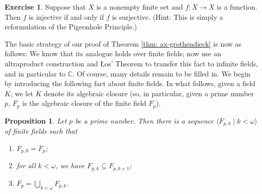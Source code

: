\documentclass[a4paper]{memoir}
\newtheorem{proposition}[theorem]{Proposition}
\theoremstyle{definition}
\newtheorem{exercise}[theorem]{Exercise}
\newcommand{\bb}{\mathbb}
\newcommand{\ra}{\rightarrow}
\begin{document}
\begin{exercise} \label{exercise: finite_ax_grothendieck}
  Suppose that $X$ is a nonempty finite set and $f:X \ra X$ is a function. Then $f$ is injective if and 
  only if $f$ is surjective. (Hint: This is simply a reformulation of the Pigeonhole Principle.)
\end{exercise}

The basic strategy of our proof of Theorem \ref{thm: ax-grothendieck} is now as follows: 
We know that its analogue holds over finite fields; now use an ultraproduct construction 
and \L os' Theorem to transfer this fact to infinite fields, and in particular to $\bb{C}$. 
Of course, many details remain to be filled in. We begin by introducing the following fact 
about finite fields. In what follows, given a field $K$, we let $\overline{K}$ denote its 
algebraic closure (so, in particular, given a prime number $p$, $\overline{F_p}$ is the algebraic 
closure of the finite field $F_p$).

\begin{proposition} \label{prop: finite_field_completion}
  Let $p$ be a prime number. Then there is a sequence $\langle F_{p,k} \mid k < \omega \rangle$ 
  of finite fields such that
  \begin{enumerate}
    \item $F_{p,0} = F_p$;
    \item for all $k < \omega$, we have $F_{p,k} \subseteq F_{p,k+1}$;
    \item $\overline{F_p} = \bigcup_{k < \omega} F_{p,k}$.
  \end{enumerate}
\end{proposition}
\end{document}
